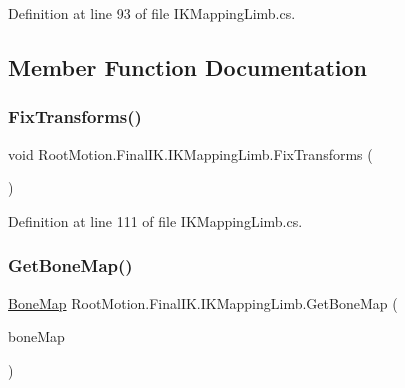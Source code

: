 Definition at line 93 of file I\+K\+Mapping\+Limb.\+cs.



\subsection{Member Function Documentation}
\mbox{\label{class_root_motion_1_1_final_i_k_1_1_i_k_mapping_limb_a6ee96ea8c48d8b3640037ce7623b814f}} 
\subsubsection{\texorpdfstring{Fix\+Transforms()}{FixTransforms()}}
{\footnotesize\ttfamily void Root\+Motion.\+Final\+I\+K.\+I\+K\+Mapping\+Limb.\+Fix\+Transforms (\begin{DoxyParamCaption}{ }\end{DoxyParamCaption})}



Definition at line 111 of file I\+K\+Mapping\+Limb.\+cs.

\mbox{\label{class_root_motion_1_1_final_i_k_1_1_i_k_mapping_limb_a72756abf29a9f7bd26c9b63a43cf022d}} 
\subsubsection{\texorpdfstring{Get\+Bone\+Map()}{GetBoneMap()}}
{\footnotesize\ttfamily \mbox{\hyperlink{class_root_motion_1_1_final_i_k_1_1_i_k_mapping_1_1_bone_map}{Bone\+Map}} Root\+Motion.\+Final\+I\+K.\+I\+K\+Mapping\+Limb.\+Get\+Bone\+Map (\begin{DoxyParamCaption}\item[{\mbox{\hyperlink{class_root_motion_1_1_final_i_k_1_1_i_k_mapping_limb_af0c71500c2436aef8e0a11f5847efdcd}{Bone\+Map\+Type}}}]{bone\+Map }\end{DoxyParamCaption})}



